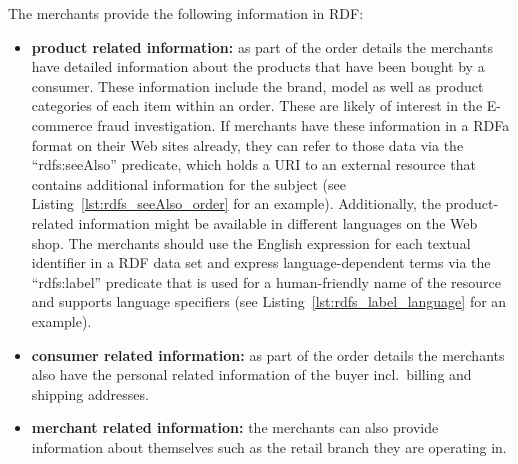 The merchants provide the following information in \gls{RDF}:\@

\begin{itemize}
  \item \textbf{product related information:} as part of the order details the merchants have detailed information about the products that have been bought by a consumer. These information include the brand, model as well as product categories of each item within an order. These are likely of interest in the \gls{E-commerce} fraud investigation. If merchants have these information in a \gls{RDFa} format on their Web sites already, they can refer to those data via the ``rdfs:seeAlso'' predicate, which holds a \gls{URI} to an external resource that contains additional information for the subject (see Listing~\ref{lst:rdfs_seeAlso_order} for an example). Additionally, the product-related information might be available in different languages on the Web shop. The merchants should use the English expression for each textual identifier in a \gls{RDF} data set and express language-dependent terms via the ``rdfs:label'' predicate that is used for a human-friendly name of the resource and supports language specifiers (see Listing~\ref{lst:rdfs_label_language} for an example).
  \item \textbf{consumer related information:} as part of the order details the merchants also have the personal related information of the buyer incl.\ billing and shipping addresses.
  \item \textbf{merchant related information:} the merchants can also provide information about themselves such as the retail branch they are operating in.
\end{itemize}




